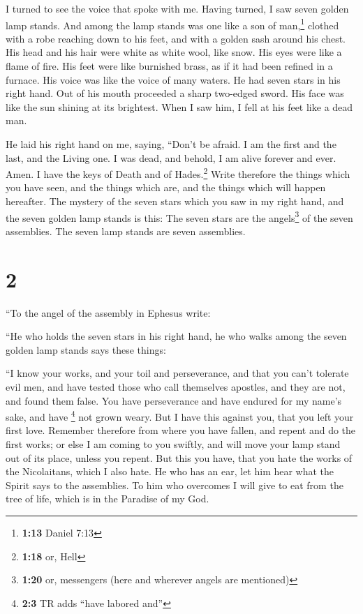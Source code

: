  I turned to see the voice that spoke with me. Having
turned, I saw seven golden lamp stands.  And among the
lamp stands was one like a son of man,\footnote{\textbf{1:13} Daniel
  7:13} clothed with a robe reaching down to his feet, and with a golden
sash around his chest.  His head and his hair were white
as white wool, like snow. His eyes were like a flame of fire.
 His feet were like burnished brass, as if it had been
refined in a furnace. His voice was like the voice of many waters.
 He had seven stars in his right hand. Out of his mouth
proceeded a sharp two-edged sword. His face was like the sun shining at
its brightest.  When I saw him, I fell at his feet like a
dead man.

He laid his right hand on me, saying, ``Don't be afraid. I am the first
and the last,  and the Living one. I was dead, and
behold, I am alive forever and ever. Amen. I have the keys of Death and
of Hades.\footnote{\textbf{1:18} or, Hell}  Write
therefore the things which you have seen, and the things which are, and
the things which will happen hereafter.  The mystery of
the seven stars which you saw in my right hand, and the seven golden
lamp stands is this: The seven stars are the angels\footnote{\textbf{1:20}
  or, messengers (here and wherever angels are mentioned)} of the seven
assemblies. The seven lamp stands are seven assemblies.

\hypertarget{section-1}{%
\section{2}\label{section-1}}

 ``To the angel of the assembly in Ephesus write:

``He who holds the seven stars in his right hand, he who walks among the
seven golden lamp stands says these things:

 ``I know your works, and your toil and perseverance, and
that you can't tolerate evil men, and have tested those who call
themselves apostles, and they are not, and found them false.
 You have perseverance and have endured for my name's
sake, and have \footnote{\textbf{2:3} TR adds ``have labored and''} not
grown weary.  But I have this against you, that you left
your first love.  Remember therefore from where you have
fallen, and repent and do the first works; or else I am coming to you
swiftly, and will move your lamp stand out of its place, unless you
repent.  But this you have, that you hate the works of the
Nicolaitans, which I also hate.  He who has an ear, let
him hear what the Spirit says to the assemblies. To him who overcomes I
will give to eat from the tree of life, which is in the Paradise of my
God.

